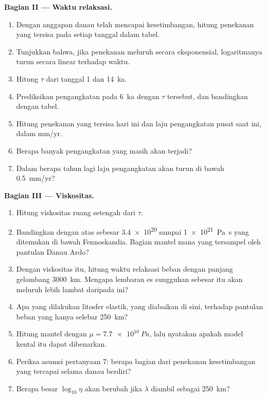 \begin{problem}
\medskip\noindent\textbf{Bagian II --- Waktu relaksasi.}
\begin{enumerate}[resume]
  \item Dengan anggapan danau telah mencapai kesetimbangan, hitung penekanan yang tersisa
        pada setiap tanggal dalam tabel.
  \item Tunjukkan bahwa, jika penekanan meluruh secara eksponensial, logaritmanya turun
        secara linear terhadap waktu.
  \item Hitung $\tau$ dari tanggal 1 dan \qty{14}{ka}.
  \item Prediksikan pengangkatan pada \qty{6}{ka} dengan $\tau$ tersebut, dan bandingkan dengan
        tabel.
  \item Hitung penekanan yang tersisa hari ini dan laju pengangkatan pusat saat ini,
        dalam \unit{mm/yr}.
  \item Berapa banyak pengangkatan yang masih akan terjadi?
  \item Dalam berapa tahun lagi laju pengangkatan akan turun di bawah
        \qty{0.5}{mm/yr}?
\end{enumerate}

\medskip\noindent\textbf{Bagian III --- Viskositas.}
\begin{enumerate}[resume]
  \item Hitung viskositas ruang setengah dari $\tau$.
  \item Bandingkan dengan  atas sebesar \num{3.4e20} sampai
        \qty{1e21}{Pa.s} yang ditemukan di bawah Fennoskandia. Bagian mantel mana
        yang tersampel oleh pantulan Danau Ardo?
  \item Dengan viskositas itu, hitung waktu relaksasi beban
        dengan panjang gelombang \qty{3000}{km}. Mengapa lembaran es sungguhan sebesar itu
        akan meluruh lebih lambat daripada ini?
  \item Apa yang dilakukan litosfer elastik, yang diabaikan di sini, terhadap pantulan
        beban yang hanya selebar \qty{250}{km}?
  \item Hitung  mantel dengan $\mu = \qty{7.7e10}{Pa}$, lalu
        nyatakan apakah model kental itu dapat dibenarkan.
  \item Periksa asumsi pertanyaan 7: berapa bagian dari penekanan kesetimbangan
        yang tercapai selama danau berdiri?
  \item Berapa besar $\log_{10}\eta$ akan berubah jika $\lambda$ diambil sebagai
        \qty{250}{km}?
\end{enumerate}


\end{problem}
